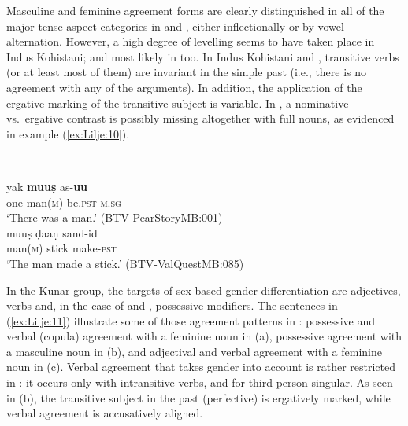 \documentclass[output=collectionpaper]{langsci/langscibook}
\begin{document}
Masculine and feminine agreement forms are clearly distinguished in all of the major tense-aspect categories in  and , either inflectionally or by vowel alternation. However, a high degree of levelling seems to have taken place in Indus Kohistani; and most likely in  too. In Indus Kohistani and , transitive verbs (or at least most of them) are invariant in the simple past (i.e., there is no agreement with any of the arguments). In addition, the application of the ergative marking of the transitive subject is variable. In , a nominative vs.\ ergative contrast is possibly missing altogether with full nouns, as evidenced in example (\ref{ex:Lilje:10}).

\ea
\label{ex:Lilje:10}
\\
\begin{xlist}
\ex
\gll yak \textbf{muuṣ} as-\textbf{uu}\\
one man(\textsc{m}) be.\textsc{pst-m.sg}     \\
\glt `There was a man.' (BTV-PearStoryMB:001)\\
\ex
\gll muuṣ ḍaaṇ sand{}-id\\
man(\textsc{m}) stick make-\textsc{pst}     \\
\glt `The man made a stick.' (BTV-ValQuestMB:085)\\
\end{xlist}
\z

In the Kunar group, the targets of sex-based gender differentiation are adjectives, verbs and, in the case of  and , possessive modifiers. The sentences in (\ref{ex:Lilje:11}) illustrate some of those agreement patterns in : possessive and verbal (copula) agreement with a feminine noun in (a), possessive agreement with a masculine noun in (b), and adjectival and verbal agreement with a feminine noun in (c). Verbal agreement that takes gender into account is rather restricted in : it occurs only with intransitive verbs, and for third person singular. As seen in (b), the transitive subject in the past (perfective) is ergatively marked, while verbal agreement is accusatively aligned.
\end{document}
